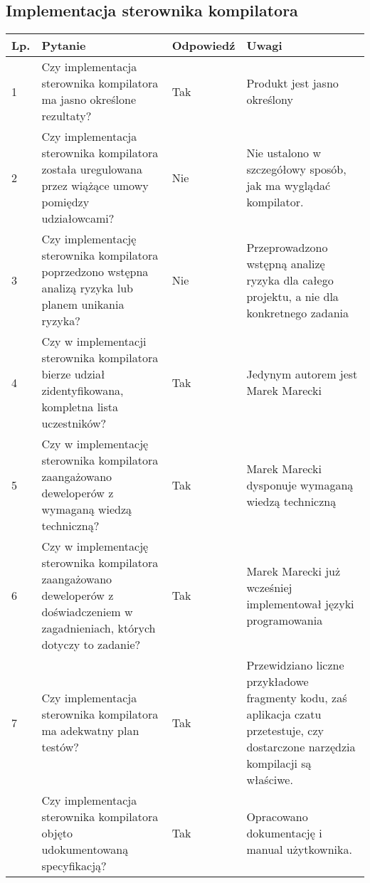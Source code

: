 \documentclass[11pt,oneside,a4paper,titlepage,onecolumn]{article}
\begin{document}
\subsection{Implementacja sterownika kompilatora}

\begin{tabularx}{\textwidth}{|l|X|l|X|}
	\hline
	
	\hline
    Lp. & Pytanie & Odpowiedź & Uwagi \\ \hline
    
    1 
    & Czy implementacja sterownika kompilatora ma jasno 
    określone rezultaty?
    & Tak
    & Produkt jest jasno określony
    \\\hline

    2
	& Czy implementacja sterownika kompilatora została
	uregulowana	przez wiążące umowy pomiędzy udziałowcami?
	& Nie
	& Nie ustalono w szczegółowy sposób, jak ma wyglądać kompilator.
	\\\hline	
	
	3
	& Czy implementację sterownika kompilatora
	poprzedzono wstępna	analizą	ryzyka lub planem unikania ryzyka?
	& Nie
	& Przeprowadzono wstępną analizę ryzyka dla całego projektu, a
	nie dla konkretnego zadania
	\\\hline
	
	4
	& Czy w implementacji sterownika kompilatora bierze
	udział zidentyfikowana, kompletna lista uczestników?
	& Tak
	& Jedynym autorem jest Marek Marecki
	\\\hline

	5
	& Czy w implementację sterownika kompilatora
	zaangażowano deweloperów z wymaganą wiedzą techniczną?
	& Tak
	& Marek Marecki dysponuje wymaganą wiedzą techniczną
	\\\hline
	
	6
	& Czy w implementację sterownika kompilatora
	zaangażowano deweloperów z doświadczeniem w zagadnieniach,
	których dotyczy to zadanie?
	& Tak
	& Marek Marecki już wcześniej implementował języki programowania
	\\\hline
   
	7
	& Czy implementacja sterownika kompilatora ma
	adekwatny plan testów?
	& Tak
	& Przewidziano liczne przykładowe fragmenty kodu, zaś aplikacja
	czatu przetestuje, czy dostarczone narzędzia kompilacji są
	właściwe. 
	\\\hline	

	& Czy implementacja sterownika kompilatora objęto
	udokumentowaną specyfikacją?
	& Tak
	& Opracowano dokumentację i manual użytkownika.
	\\\hline
\end{tabularx}
    
\end{document}
